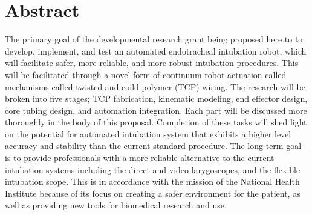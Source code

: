 \section{Abstract}
\label{sect:abstract}

The primary goal of the developmental research grant being proposed here to to develop, implement, and test an automated endotracheal intubation robot, which will facilitate safer, more reliable, and more robust intubation procedures. This will be facilitated through a novel form of continuum robot actuation called mechanisms called twisted and coild polymer (TCP) wiring. The research will be broken into five stages; TCP fabrication, kinematic modeling, end effector design, core tubing design, and automation integration. Each part will be discussed more thoroughly in the body of this proposal. Completion of these tasks will shed light on the potential for automated intubation system that exhibits a higher level accuracy and stability than the current standard procedure. The long term goal is to provide professionals with a more reliable alternative to the current intubation systems including the direct and video larygoscopes, and the flexible intubation scope. This is in accordance with the mission of the National Health Institute because of its focus on creating a safer environment for the patient, as well as providing new tools for biomedical research and use.